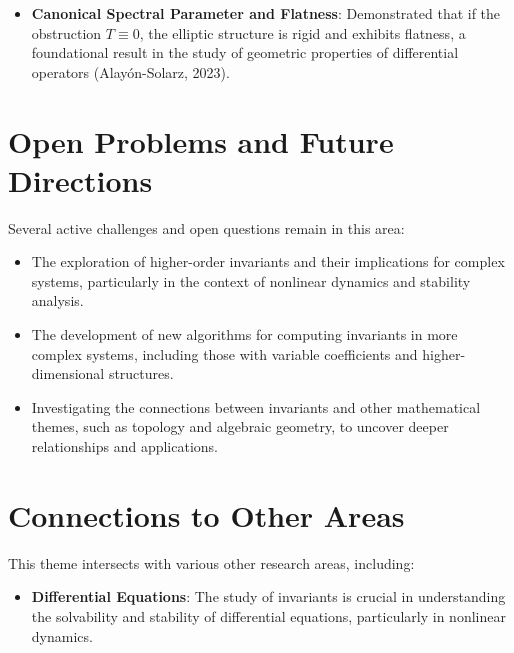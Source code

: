 \documentclass[11pt,a4paper]{article}
\begin{document}
\begin{itemize}
\item \textbf{Canonical Spectral Parameter and Flatness}: Demonstrated that if the obstruction \( T \equiv 0 \), the elliptic structure is rigid and exhibits flatness, a foundational result in the study of geometric properties of differential operators (Alayón-Solarz, 2023).
\end{itemize}

\section{Open Problems and Future Directions}

Several active challenges and open questions remain in this area:

\begin{itemize}
\item The exploration of higher-order invariants and their implications for complex systems, particularly in the context of nonlinear dynamics and stability analysis.
\end{itemize}

\begin{itemize}
\item The development of new algorithms for computing invariants in more complex systems, including those with variable coefficients and higher-dimensional structures.
\end{itemize}

\begin{itemize}
\item Investigating the connections between invariants and other mathematical themes, such as topology and algebraic geometry, to uncover deeper relationships and applications.
\end{itemize}

\section{Connections to Other Areas}

This theme intersects with various other research areas, including:

\begin{itemize}
\item \textbf{Differential Equations}: The study of invariants is crucial in understanding the solvability and stability of differential equations, particularly in nonlinear dynamics.
\end{itemize}
\end{document}
